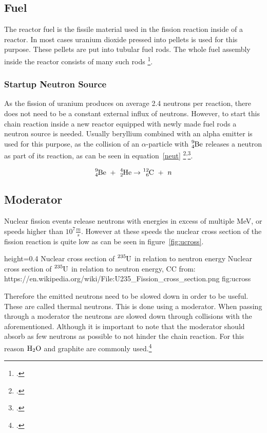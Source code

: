 \subsection{Fuel}
The reactor fuel is the fissile material used in the fission reaction inside of a reactor. In
most cases uranium dioxide  pressed into pellets is used for this purpose. These
pellets are put into tubular fuel rods. The whole fuel assembly inside the reactor consists of many
such rods \footcite{WNPR}.
\subsubsection{Startup Neutron Source}
As the fission of uranium produces on average 2.4 neutrons per reaction, there does not need to be
a constant external influx of neutrons. However, to start this chain reaction inside a new reactor
equipped with newly made fuel rods a neutron source is needed. Usually beryllium combined with an
alpha emitter is used for this purpose, as the collision of an $\alpha$-particle with $\ce{^{9}_{4}Be}$
releases a neutron as part of its reaction, as can be seen in equation~\ref{neut} \footcite{WNPR}\textsuperscript{,}\footcite[100]{nucfundamentals}.

\begin{equation}
    \label{neut}
    \ce{^{9}_{4}Be} ~+~ \ce{^{4}_{2}He} \rightarrow \ce{^{12}_{6}C} ~+~ n
\end{equation}

\pagebreak
\subsection{Moderator}
Nuclear fission events release neutrons with energies in excess of multiple MeV, or speeds higher
than $10^{7} \frac{m}{s}$. However at these speeds the nuclear cross section of the fission reaction
is quite low as can be seen in figure~\ref{fig:ucross}.

  {height=0.4\textheight}%
  {Nuclear cross section of $\ce{^{235}U}$ in relation to neutron energy}%
  {Nuclear cross section of $\ce{^{235}U}$ in relation to neutron energy, CC from: https://en.wikipedia.org/wiki/File:U235\_Fission\_cross\_section.png}%
  {fig:ucross}%

  Therefore the emitted neutrons need to be slowed down in order to be useful. These are called thermal neutrons.
  This is done using a moderator. When passing through a moderator the neutrons are slowed down through
  collisions with the aforementioned. Although it is important to note that the moderator should absorb
  as few neutrons as possible to not hinder the chain reaction. For this reason $\ce{H_{2}O}$ 
  and graphite are commonly used.\footcite[28]{ReactorPhysics}
